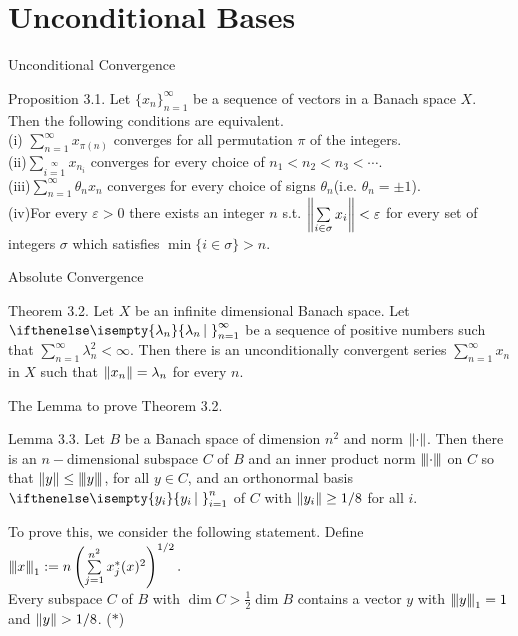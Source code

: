 \documentclass{beamer}
\begin{document}
\section{Unconditional Bases}
\begin{frame}{Unconditional Convergence}
    \begin{block}{Proposition 3.1.}
        Let $\{x_n\}_{n=1}^\infty$ be a sequence of vectors in a Banach space $X$. Then the following conditions are equivalent.\\
             (i) $\sum_{n=1}^\infty x_{\pi(n)}$  converges for all permutation $\pi$ of the integers.\\
             (ii)$\sum_{i=1}\limits^\infty x_{n_i}$ converges for every choice of $n_1<n_2<n_3<\cdots$.\\
             (iii)$\sum\limits_{n=1}^\infty \theta_nx_{n}$ converges for every choice of signs $\theta_n$(i.e. $\theta_n=\pm1$).\\
             (iv)For every $\varepsilon>0$ there exists an integer $n$ s.t. $\left\lVert \sum\limits_{i\in\sigma}x_i \right\rVert<\varepsilon$ for every set of integers $\sigma$ which satisfies $\min\{i\in\sigma\}>n$.
        
    \end{block}
\end{frame}
\begin{frame}{Absolute Convergence}
    \begin{block}{Theorem 3.2.}
        Let $X$ be an infinite dimensional Banach space. Let $\set{\lambda_n}_{n=1}^\infty$ be a sequence of positive numbers such that $\sum\limits_{n=1}^\infty \lambda_n^2<\infty$. Then there is an unconditionally convergent series $\sum\limits_{n=1}^\infty x_n$ in $X$ such that $\left\lVert x_n \right\rVert=\lambda_n$ for every $n$.
    \end{block}
\end{frame}
\begin{frame}{The Lemma to prove Theorem 3.2.}
    \begin{block}{Lemma 3.3.}
        Let $B$ be a Banach space of dimension $n^2$ and norm $\left\lVert \cdot \right\rVert$. Then there is an $n-$dimensional subspace $C$ of $B$ and an inner product norm $\left\lvert\kern-0.25ex\left\lvert\kern-0.25ex\left\lvert \cdot \right\rvert\kern-0.25ex\right\rvert\kern-0.25ex\right\rvert$ on $C$ so that $\left\lVert y \right\rVert\leq\left\lvert\kern-0.25ex\left\lvert\kern-0.25ex\left\lvert y \right\rvert\kern-0.25ex\right\rvert\kern-0.25ex\right\rvert$, for all $y\in C$, and an orthonormal basis $\set{y_i}_{i=1}^n$ of $C$ with $\left\lVert y_i \right\rVert\geq 1/8$ for all $i$.
    \end{block}
    To prove this, we consider the following statement. Define $\left\lvert\kern-0.25ex\left\lvert\kern-0.25ex\left\lvert x \right\rvert\kern-0.25ex\right\rvert\kern-0.25ex\right\rvert_1:=n\left(\sum\limits_{j=1}^{n^2}x_j^*(x)^2\right)^{1/2}.$\\
    Every subspace $C$ of $B$ with $\dim C>\frac{1}{2}\dim B$ contains a vector $y$ with $\left\lvert\kern-0.25ex\left\lvert\kern-0.25ex\left\lvert y \right\rvert\kern-0.25ex\right\rvert\kern-0.25ex\right\rvert_1=1$ and $\left\lVert y \right\rVert>1/8$. ($*$)\\
\end{frame}
\end{document}
